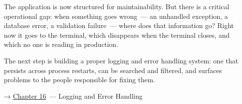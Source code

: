 \label{15-structuring-the-application:whats-next}

The application is now structured for maintainability. But there is a critical operational gap: when something goes wrong~--- an unhandled exception, a database error, a validation failure~--- where does that information go? Right now it goes to the terminal, which disappears when the terminal closes, and which no one is reading in production.

The next step is building a proper logging and error handling system: one that persists across process restarts, can be searched and filtered, and surfaces problems to the people responsible for fixing them.

\noindent{}→ \hyperref[ch:16-logging-error-handling]{Chapter 16}~--- Logging and Error Handling

